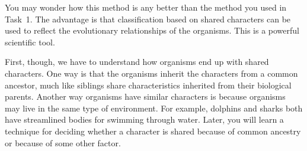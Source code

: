 \documentclass[12pt, hidelinks]{exam}
\begin{document}
You may wonder how this method is any better than the method you used in Task~1. The advantage is that classification based on shared characters can be used to reflect the evolutionary relationships of the organisms. This is a powerful scientific tool. 

First, though, we have to understand how organisms end up with shared characters.  One way is that the organisms inherit the characters from a common ancestor, much like siblings share characteristics inherited from their biological parents. Another way organisms have similar characters is because organisms may live in the same type of environment. For example, dolphins and sharks both have streamlined bodies for swimming through water. Later, you will learn a technique for deciding whether a character is shared because of common ancestry or because of some other factor.


\end{document}
